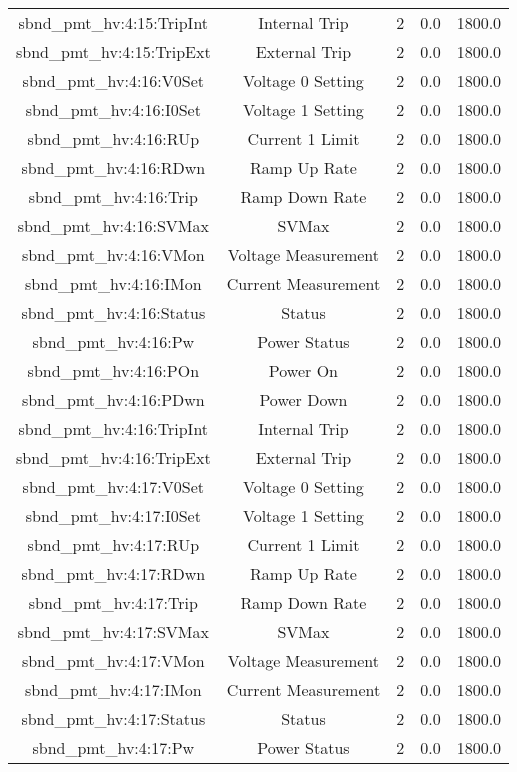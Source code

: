 \begin{center}
\begin{longtable}{c | c c c c }
sbnd\_pmt\_hv:4:15:TripInt & Internal Trip & 2 & 0.0 & 1800.0\\ 
sbnd\_pmt\_hv:4:15:TripExt & External Trip & 2 & 0.0 & 1800.0\\ 
sbnd\_pmt\_hv:4:16:V0Set & Voltage 0 Setting & 2 & 0.0 & 1800.0\\ 
sbnd\_pmt\_hv:4:16:I0Set & Voltage 1 Setting & 2 & 0.0 & 1800.0\\ 
sbnd\_pmt\_hv:4:16:RUp & Current 1 Limit & 2 & 0.0 & 1800.0\\ 
sbnd\_pmt\_hv:4:16:RDwn & Ramp Up Rate & 2 & 0.0 & 1800.0\\ 
sbnd\_pmt\_hv:4:16:Trip & Ramp Down Rate & 2 & 0.0 & 1800.0\\ 
sbnd\_pmt\_hv:4:16:SVMax & SVMax & 2 & 0.0 & 1800.0\\ 
sbnd\_pmt\_hv:4:16:VMon & Voltage Measurement & 2 & 0.0 & 1800.0\\ 
sbnd\_pmt\_hv:4:16:IMon & Current Measurement & 2 & 0.0 & 1800.0\\ 
sbnd\_pmt\_hv:4:16:Status & Status & 2 & 0.0 & 1800.0\\ 
sbnd\_pmt\_hv:4:16:Pw & Power Status & 2 & 0.0 & 1800.0\\ 
sbnd\_pmt\_hv:4:16:POn & Power On & 2 & 0.0 & 1800.0\\ 
sbnd\_pmt\_hv:4:16:PDwn & Power Down & 2 & 0.0 & 1800.0\\ 
sbnd\_pmt\_hv:4:16:TripInt & Internal Trip & 2 & 0.0 & 1800.0\\ 
sbnd\_pmt\_hv:4:16:TripExt & External Trip & 2 & 0.0 & 1800.0\\ 
sbnd\_pmt\_hv:4:17:V0Set & Voltage 0 Setting & 2 & 0.0 & 1800.0\\ 
sbnd\_pmt\_hv:4:17:I0Set & Voltage 1 Setting & 2 & 0.0 & 1800.0\\ 
sbnd\_pmt\_hv:4:17:RUp & Current 1 Limit & 2 & 0.0 & 1800.0\\ 
sbnd\_pmt\_hv:4:17:RDwn & Ramp Up Rate & 2 & 0.0 & 1800.0\\ 
sbnd\_pmt\_hv:4:17:Trip & Ramp Down Rate & 2 & 0.0 & 1800.0\\ 
sbnd\_pmt\_hv:4:17:SVMax & SVMax & 2 & 0.0 & 1800.0\\ 
sbnd\_pmt\_hv:4:17:VMon & Voltage Measurement & 2 & 0.0 & 1800.0\\ 
sbnd\_pmt\_hv:4:17:IMon & Current Measurement & 2 & 0.0 & 1800.0\\ 
sbnd\_pmt\_hv:4:17:Status & Status & 2 & 0.0 & 1800.0\\ 
sbnd\_pmt\_hv:4:17:Pw & Power Status & 2 & 0.0 & 1800.0\\ 

\end{longtable}
\end{center}
